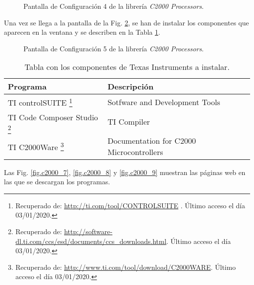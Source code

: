 \documentclass{report}
\begin{document}
\begin{figure}[!h]
    \begin{center}
    \resizebox{10Cm}{!}{\texttt{[image: c2000\_5]}}
    \caption{Pantalla de Configuración 4 de la librería \textit{C2000 Processors}.}    \label{fig.c2000_5} 
    \end{center}
\end{figure}

Una vez se llega a la pantalla de la Fig. \ref{fig.c2000_6}, se han de instalar los componentes que aparecen en la ventana y se describen en la Tabla \ref{tab.c2000_requisitos}.
\begin{figure}[!h]
    \begin{center}
    \resizebox{10Cm}{!}{\texttt{[image: c2000\_6]}}
    \caption{Pantalla de Configuración 5 de la librería \textit{C2000 Processors}.}    \label{fig.c2000_6} 
    \end{center}
\end{figure}

\begin{table}[!h]
    \begin{center}
    \begin{tabular}{|l|l|} \hline\hline\hline
    \textbf{Programa} & \textbf{Descripción} \\ \hline
    TI controlSUITE \footnote{Recuperado de: \url{http://ti.com/tool/CONTROLSUITE} . Último acceso el día 03/01/2020.} & Sotfware and Development Tools \\ \hline

    TI Code Composer Studio \footnote{Recuperado de: \url{http://software-dl.ti.com/ccs/esd/documents/ccs_downloads.html}. Último acceso el día 03/01/2020.} & TI Compiler \\ \hline
    
    TI C2000Ware \footnote{Recuperado de: \url{http://www.ti.com/tool/download/C2000WARE}. Último acceso el día 03/01/2020.} & Documentation for C2000 Microcontrollers\\ \hline

    \end{tabular}
    \end{center}
    \caption{Tabla con los componentes de Texas Instruments a instalar.} \label{tab.c2000_requisitos}
\end{table}

\clearpage

Las Fig. \ref{fig.c2000_7}, \ref{fig.c2000_8} y \ref{fig.c2000_9} muestran las páginas web en las que se descargan los programas.
\end{document}
